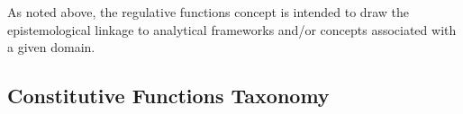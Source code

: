 \begin{itemize}
%
%
%
%
%
\end{itemize}

As noted above, the regulative functions concept is intended to draw the epistemological linkage to analytical frameworks and/or concepts associated with a given domain. 

\subsection{Constitutive Functions Taxonomy}
\label{subsec:confunc}

